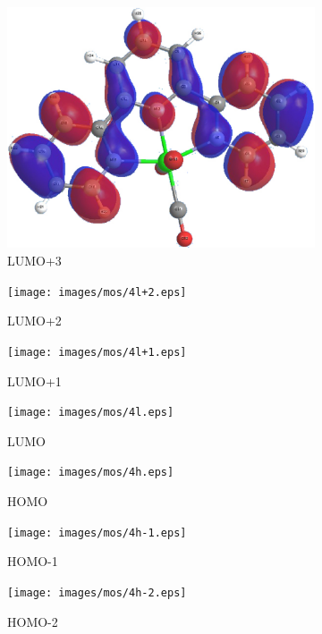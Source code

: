 \begin{figure}[!ht]
 \centering
 \begin{subfigure}[b]{0.31\textwidth}
  \includegraphics[clip=true, width=\textwidth, keepaspectratio]{images/mos/4l+3.eps}
  \caption{LUMO+3}
 \end{subfigure}
 \begin{subfigure}[b]{0.31\textwidth}
  \texttt{[image: images/mos/4l+2.eps]}
  \caption{LUMO+2}
 \end{subfigure}
  \begin{subfigure}[b]{0.31\textwidth}
  \texttt{[image: images/mos/4l+1.eps]}
  \caption{LUMO+1}
 \end{subfigure}
  \begin{subfigure}[b]{0.31\textwidth}
  \texttt{[image: images/mos/4l.eps]}
  \caption{LUMO}
 \end{subfigure}
 \begin{subfigure}[b]{0.31\textwidth}
  \texttt{[image: images/mos/4h.eps]}
  \caption{HOMO}
 \end{subfigure}
 \begin{subfigure}[b]{0.31\textwidth}
  \texttt{[image: images/mos/4h-1.eps]}
  \caption{HOMO-1}
 \end{subfigure}
 \begin{subfigure}[b]{0.31\textwidth}
  \texttt{[image: images/mos/4h-2.eps]}
  \caption{HOMO-2}
 \end{subfigure}
 \begin{subfigure}[b]{0.31\textwidth}

\end{subfigure}
\end{figure}
